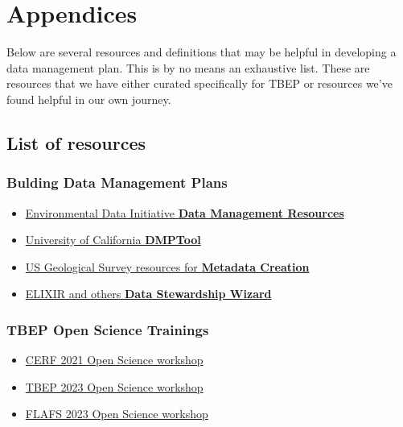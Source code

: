 \documentclass[
]{book}
\providecommand{\tightlist}{%
  \setlength{\itemsep}{0pt}\setlength{\parskip}{0pt}}
\begin{document}
\chapter{Appendices}\label{appendices}

Below are several resources and definitions that may be helpful in developing a data management plan. This is by no means an exhaustive list. These are resources that we have either curated specifically for TBEP or resources we've found helpful in our own journey.

\section{List of resources}\label{list-of-resources}

\subsection{Bulding Data Management Plans}\label{bulding-data-management-plans}

\begin{itemize}
\tightlist
\item
  \href{https://environmentaldatainitiative.org/dm-resources/}{Environmental Data Initiative \textbf{Data Management Resources}}
\item
  \href{https://dmptool.org/}{University of California \textbf{DMPTool}}
\item
  \href{https://www.usgs.gov/products/data-and-tools/data-management/metadata-creation}{US Geological Survey resources for \textbf{Metadata Creation}}
\item
  \href{https://ds-wizard.org/}{ELIXIR and others \textbf{Data Stewardship Wizard}}
\end{itemize}

\subsection{TBEP Open Science Trainings}\label{tbep-open-science-trainings}

\begin{itemize}
\tightlist
\item
  \href{https://tbep-tech.github.io/cerf-os-workshop/}{CERF 2021 Open Science workshop}
\item
  \href{https://tbep-tech.github.io/tbep-os-workshop/}{TBEP 2023 Open Science workshop}
\item
  \href{https://tbep-tech.github.io/flafs-os-workshop/}{FLAFS 2023 Open Science workshop}
\end{itemize}
\end{document}
